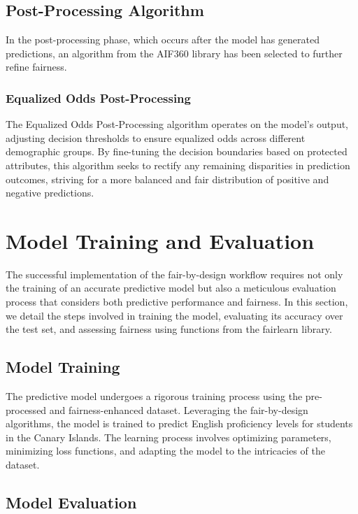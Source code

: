 \documentclass[12pt,a4paper,openright,twoside]{book}
\begin{document}
\subsection{Post-Processing Algorithm}

In the post-processing phase, which occurs after the model has generated predictions, an algorithm from the AIF360 library has been selected to further refine fairness.

\subsubsection{Equalized Odds Post-Processing}

The Equalized Odds Post-Processing algorithm operates on the model's output, adjusting decision thresholds to ensure equalized odds across different demographic groups. By fine-tuning the decision boundaries based on protected attributes, this algorithm seeks to rectify any remaining disparities in prediction outcomes, striving for a more balanced and fair distribution of positive and negative predictions.

\section{Model Training and Evaluation}

The successful implementation of the fair-by-design workflow requires not only the training of an accurate predictive model but also a meticulous evaluation process that considers both predictive performance and fairness. In this section, we detail the steps involved in training the model, evaluating its accuracy over the test set, and assessing fairness using functions from the fairlearn library.

\subsection{Model Training}

The predictive model undergoes a rigorous training process using the pre-processed and fairness-enhanced dataset. Leveraging the fair-by-design algorithms, the model is trained to predict English proficiency levels for students in the Canary Islands. The learning process involves optimizing parameters, minimizing loss functions, and adapting the model to the intricacies of the dataset.

\subsection{Model Evaluation}
\end{document}
